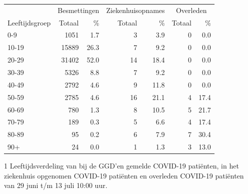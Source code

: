 \documentclass[
  english,
  man,floatsintext]{apa6}
\begin{document}
\begin{table}
\centering\begingroup\fontsize{11}{13}\selectfont

\begin{threeparttable}
\begin{tabular}{lrrrrrr}
\toprule
\multicolumn{1}{c}{ } & \multicolumn{2}{c}{Besmettingen} & \multicolumn{2}{c}{Ziekenhuisopnames} & \multicolumn{2}{c}{Overleden} \\
\cmidrule(l{3pt}r{3pt}){2-3} \cmidrule(l{3pt}r{3pt}){4-5} \cmidrule(l{3pt}r{3pt}){6-7}
Leeftijdsgroep & Totaal & \% & Totaal & \% & Totaal & \%\\
\midrule
0-9 & 1051 & 1.7 & 3 & 3.9 & 0 & 0.0\\
10-19 & 15889 & 26.3 & 7 & 9.2 & 0 & 0.0\\
20-29 & 31402 & 52.0 & 14 & 18.4 & 0 & 0.0\\
30-39 & 5326 & 8.8 & 7 & 9.2 & 0 & 0.0\\
40-49 & 2792 & 4.6 & 9 & 11.8 & 0 & 0.0\\
50-59 & 2785 & 4.6 & 16 & 21.1 & 4 & 17.4\\
60-69 & 780 & 1.3 & 8 & 10.5 & 5 & 21.7\\
70-79 & 189 & 0.3 & 5 & 6.6 & 4 & 17.4\\
80-89 & 95 & 0.2 & 6 & 7.9 & 7 & 30.4\\
90+ & 24 & 0.0 & 1 & 1.3 & 3 & 13.0\\
\bottomrule
\end{tabular}
\begin{tablenotes}
\item[1] Leeftijdsverdeling van bij de GGD’en gemelde COVID-19 patiënten, in het ziekenhuis opgenomen COVID-19 patiënten en overleden COVID-19 patiënten van 29 juni t/m 13 juli 10:00 uur.
\end{tablenotes}
\end{threeparttable}
\endgroup{}
\end{table}

\newpage
\end{document}
